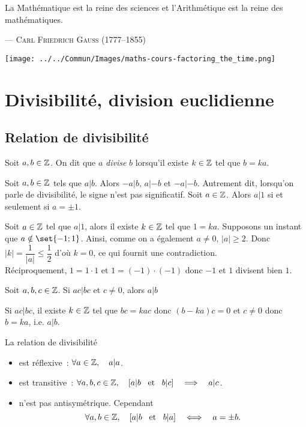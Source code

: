 \documentclass{magnolia}
\begin{document}
\setlength{}
\epigraph{\og La Mathématique est la reine des sciences et l'Arithmétique est
la reine des mathématiques. \fg}{--- \textsc{Carl Friedrich Gauss (1777--1855)}}
\bigskip
\hfill\texttt{[image: ../../Commun/Images/maths-cours-factoring\_the\_time.png]}

\magtoc

\section{Divisibilité, division euclidienne}

\subsection{Relation de divisibilité}
\begin{definition}
Soit $a,b\in\mathbb{Z}$. On dit que $a$ \emph{divise} $b$ lorsqu'il existe $k\in\mathbb{Z}$ tel que
$b=ka$.  
\end{definition}

\begin{remarques}
\remarque Soit $a,b\in\mathbb{Z}$ tels que $a|b$. Alors $-a|b$, $a|-b$ et $-a|-b$.
  Autrement dit, lorsqu'on parle de divisibilité, le signe n'est pas
  significatif.
\remarque Soit $a\in\mathbb{Z}$. Alors $a|1$ si et seulement si $a=\pm 1$.
\begin{sol}
Soit $a\in\mathbb{Z}$ tel que $a|1$, alors il existe $k\in \mathbb{Z}$ tel que $1=ka$. Supposons un instant que $a\notin\set{-1;1}$. Ainsi, comme on a également $a\neq 0$, $|a|\geq 2$. Donc $|k|=\dfrac{1}{|a|}\leq \dfrac{1}{2}$ d'où $k=0$, ce qui fournit une contradiction.\\
Réciproquement, $1=1\cdot 1$ et $1=(-1)\cdot(-1)$ donc $-1$ et $1$ divisent bien $1$.
\end{sol}
\remarque Soit $a,b,c\in\mathbb{Z}$. Si $ac|bc$ et $c\neq 0$, alors $a|b$
\begin{sol}
Si $ac|bc$, il existe $k\in \mathbb{Z}$ tel que $bc=kac$ donc $(b-ka)c=0$ et $c\neq 0$ donc $b=ka$, i.e. $a|b$.
\end{sol}
\end{remarques}

\begin{proposition}
La relation de divisibilité
\begin{itemize}
\item est réflexive~: $\forall a\in\mathbb{Z} ,\quad a|a$.
\item est transitive~: $\forall a,b,c\in\mathbb{Z} ,\quad \left[a|b \quad\!\text{et}\quad\! b|c\right]\quad\Longrightarrow\quad a|c$.
\item n'est pas antisymétrique. Cependant
  \[\forall a,b\in\mathbb{Z} ,\quad \left[a|b \quad\!\text{et}\quad\! b|a\right]\quad\Longleftrightarrow\quad a=\pm b.\]
\end{itemize}
\end{proposition}
\end{document}
